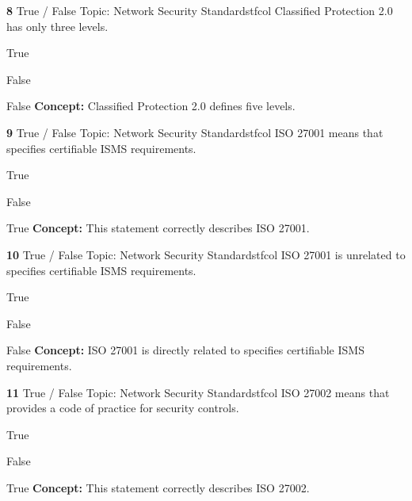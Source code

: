 \documentclass[10pt,a4paper]{article}
\begin{document}
\begin{qcard}{\color{white}\textbf{8} \hfill \small True / False \textbar{} Topic: Network Security Standards}{tfcol}
Classified Protection 2.0 has only three levels.

\begin{qoptions}
\item True
\item False
\end{qoptions}
\begin{explainbox}{False}
\textbf{Concept:} Classified Protection 2.0 defines five levels.
\end{explainbox}
\end{qcard}

\begin{qcard}{\color{white}\textbf{9} \hfill \small True / False \textbar{} Topic: Network Security Standards}{tfcol}
ISO 27001 means that specifies certifiable ISMS requirements.

\begin{qoptions}
\item True
\item False
\end{qoptions}
\begin{explainbox}{True}
\textbf{Concept:} This statement correctly describes ISO 27001.
\end{explainbox}
\end{qcard}

\begin{qcard}{\color{white}\textbf{10} \hfill \small True / False \textbar{} Topic: Network Security Standards}{tfcol}
ISO 27001 is unrelated to specifies certifiable ISMS requirements.

\begin{qoptions}
\item True
\item False
\end{qoptions}
\begin{explainbox}{False}
\textbf{Concept:} ISO 27001 is directly related to specifies certifiable ISMS requirements.
\end{explainbox}
\end{qcard}

\begin{qcard}{\color{white}\textbf{11} \hfill \small True / False \textbar{} Topic: Network Security Standards}{tfcol}
ISO 27002 means that provides a code of practice for security controls.

\begin{qoptions}
\item True
\item False
\end{qoptions}
\begin{explainbox}{True}
\textbf{Concept:} This statement correctly describes ISO 27002.
\end{explainbox}
\end{qcard}
\end{document}
